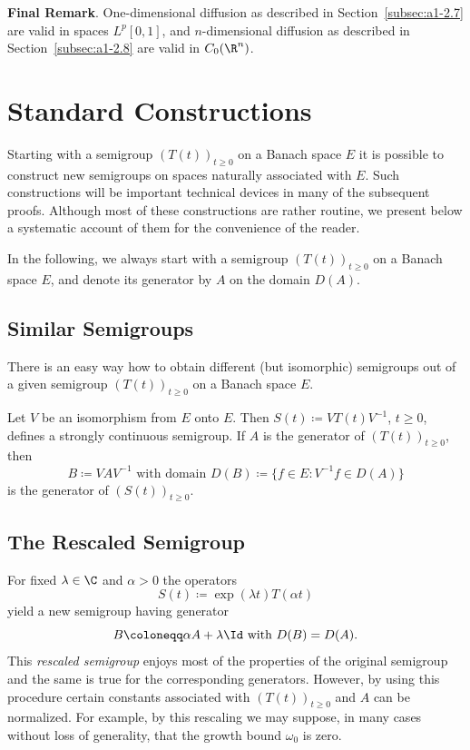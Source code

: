 \textbf{Final Remark}.  One-dimensional diffusion as described in Section~\ref{subsec:a1-2.7} are valid in spaces $L^{p}\left[ 0,1 \right]$, and $n$-dimensional diffusion as described in Section~\ref{subsec:a1-2.8} are valid in $C_{0}(\R^{n})$.
\section{Standard Constructions}\label{sec:a1-3}%
Starting with a semigroup $(T(t))_{t \geq 0}$ on a Banach space $E$ it is possible to construct new semigroups on spaces naturally associated with $E$.
Such constructions will be important technical devices in many of the subsequent proofs.
Although most of these constructions are rather routine, we present below a systematic account of them for the convenience of the reader.

In the following, we always start with a semigroup $(T(t))_{t \geq 0}$ on a Banach space $E$, and denote its generator by $A$ on the domain $D(A)$.
\subsection{Similar Semigroups}\label{subsec:a1-3.1}%

There is an easy way how to obtain different (but isomorphic) semigroups out of a given semigroup $(T(t))_{t \geq 0}$ on a Banach space $E$.

Let $V$ be an isomorphism from $E$ onto $E$.
Then $S(t) \coloneqq VT(t)V^{-1}$, $t \geq 0$, defines a strongly continuous semigroup.
If\/ $A$ is the generator of\/ $(T(t))_{t \geq 0}$, then
\[
    B \coloneqq VAV^{-1} \text{ with domain } D(B) \coloneqq \{f \in E \colon V^{-1}f \in D(A)\}
\]
is the generator of\/ $(S(t))_{t \geq 0}$.
\subsection{The Rescaled Semigroup}\label{subsec:a1-3.2}%
For fixed $\lambda \in \C$ and $\alpha > 0$ the operators
\[
    S(t) \coloneqq \exp(\lambda t)T(\alpha t)
\]
yield a new semigroup having generator
\[
    B \coloneqq \alpha A + \lambda \Id \text{ with } D(B) = D(A) .
\]
This \emph{rescaled semigroup} enjoys most of the properties of the original semigroup and the same is true for the corresponding generators.
However, by using this procedure certain constants associated with $(T(t))_{t \geq 0}$ and $A$ can be normalized.
For example, by this rescaling we may suppose, in many cases without loss of generality, that the growth bound $\omega_{0}$ is zero.

